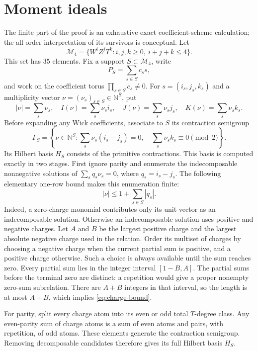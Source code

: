 \documentclass[11pt]{article}
\begin{document}
\section{Moment ideals}

The finite part of the proof is an exhaustive exact coefficient-scheme
calculation; the all-order interpretation of its survivors is conceptual.
Let
\[
 \mathcal M_4
 =\{W^iZ^jT^k:i,j,k\geq0,\ i+j+k\leq4\}.
\]
This set has \(35\) elements.  Fix a support \(S\subset\mathcal M_4\), write
\[
 P_S=\sum_{s\in S}c_ss,
\]
and work on the coefficient torus \(\prod_{s\in S}c_s\neq0\).  For
\(s=(i_s,j_s,k_s)\) and a multiplicity vector
\(\nu=(\nu_s)_{s\in S}\in\mathbb N^S\), put
\[
 |\nu|=\sum_s\nu_s,\quad
 I(\nu)=\sum_s\nu_si_s,\quad
 J(\nu)=\sum_s\nu_sj_s,\quad
K(\nu)=\sum_s\nu_sk_s.
\]
Before expanding any Wick coefficients, associate to \(S\) its contraction
semigroup
\[
 \Gamma_S=
 \left\{\nu\in\mathbb N^S:
   \sum_s\nu_s(i_s-j_s)=0,\quad
   \sum_s\nu_sk_s\equiv0\pmod2
 \right\}.
\]
Its Hilbert basis \(H_S\) consists of the primitive contractions.  This
basis is computed exactly in two stages.  First ignore parity and
enumerate the indecomposable nonnegative solutions of
\(\sum_s q_s\nu_s=0\), where \(q_s=i_s-j_s\).  The following elementary
one-row bound makes this enumeration finite:
\begin{equation}\label{eq:charge-bound}
 |\nu|\leq 1+\sum_{s\in S}|q_s|.
\end{equation}
Indeed, a zero-charge monomial contributes only its unit vector as an
indecomposable solution.  Otherwise an indecomposable solution uses
positive and negative charges.  Let \(A\) and \(B\) be the largest positive
charge and the largest absolute negative charge used in the relation.
Order its multiset of charges by choosing a negative charge when the
current partial sum is positive, and a positive charge otherwise.  Such a
choice is always available until the sum reaches zero.  Every partial sum
lies in the integer interval \([1-B,A]\).  The partial sums before the
terminal zero are distinct: a repetition would give a proper nonempty
zero-sum subrelation.  There are \(A+B\) integers in that interval, so the
length is at most \(A+B\), which implies \eqref{eq:charge-bound}.

For parity, split every charge atom into its even or odd total \(T\)-degree
class.  Any even-parity sum of charge atoms is a sum of even atoms and
pairs, with repetition, of odd atoms.  These elements generate the
contraction semigroup.  Removing decomposable candidates therefore gives
its full Hilbert basis \(H_S\).
\end{document}
